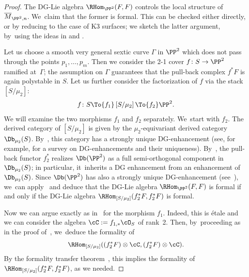 \begin{proof}
The DG-Lie algebra $\RHom_{\PP^2}(F,F)$ controls the local structure of $\overline{M}_{\PP^2,n}$. We~claim that the former is formal.
This can be checked either directly, or by reducing to the case of K3 surfaces; we sketch the latter argument, by~using the ideas in \cite{BZ:Kuranishi} and \cite{BMM:Formality}.

Let us choose a smooth very general sextic curve $\mathsf{\Gamma}$ in $\PP^2$ which does not pass through the points $p_1,\dots,p_m$. Then we consider the 2-1 cover $f\colon S\to \PP^2$ ramified at~$\mathsf{\Gamma}$; the assumption on $\mathsf{\Gamma}$ guarantees that the pull-back complex $f^*F$ is again polystable in $S$.
Let us further consider the factorization of $f$ via the stack $\left[S/\mu_2\right]$:
\[
f\colon S \To{f_1} \left[S/\mu_2\right] \To{f_2} \PP^2.
\]
We will examine the two morphisms $f_1$ and $f_2$ separately. We~start with $f_2$.
The derived category of $\left[S/\mu_2\right]$ is given by the $\mu_2$-equivariant derived category $\Db_{\mu_2}(S)$.
By~\cite[Prop.\,6.10]{CanonacoStellari:Uniqueness}, this category has a strongly unique DG-enhancement (see, for example, \cite{CanonacoStellari:Tour} for a survey on DG-enhancements and their uniqueness).
By~\cite{PolVdB:equivariant}, the pull-back functor $f_2^*$ realizes $\Db(\PP^2)$ as a full semi-orthogonal component in $\Db_{\mu_2}(S)$; in particular, it~inherits a DG enhancement from an enhancement of $\Db_{\mu_2}(S)$.
Since $\Db(\PP^2)$ has also a strongly unique DG-enhancement (see~\cite{LO:Uniqueness}), we~can apply~\cite[Prop.\,2.13]{BZ:Kuranishi} and deduce that the DG-Lie algebra $\RHom_{\PP^2}(F,F)$ is formal if and only if the DG-Lie algebra $\RHom_{[S/\mu_2]}(f_2^*F,f_2^*F)$ is formal.

Now we can argue exactly as in~\cite{BMM:Formality} for the morphism $f_1$.
Indeed, this is étale and we can consider the algebra $\cC:=f_{1,*}\cO_S$ of rank~2.
Then, by~proceeding as in the proof of~\cite[Th.\,5.3]{BMM:Formality}, we~deduce the formality of
\[
\RHom_{[S/\mu_2]}((f_2^*F)\otimes\cC,(f_2^*F)\otimes\cC).
\]
By the formality transfer theorem~\cite[Th.\,3.4]{Manetti:FormalityCriteria}, this implies the formality of $\RHom_{[S/\mu_2]}(f_2^*F,f_2^*F)$, as we needed.
\end{proof}

